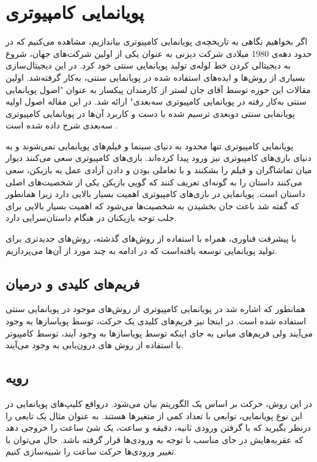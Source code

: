 \section{پویانمایی کامپیوتری}

اگر بخواهیم نگاهی به تاریخچه‌ی پویانمایی کامپیوتری بیاندازیم، مشاهده می‌کنیم که 
در حدود دهه‌ی 1980 میلادی شرکت دیزنی به عنوان یکی از اولین شرکت‌های جهان، شروع به 
دیجیتالی کردن خط لوله‌ی تولید پویانمایی سنتی خود کرد.
در این دیجیتال‌سازی بسیاری از روش‌ها و ایده‌‌های استفاده شده در پویانمایی سنتی،
به‌کار گرفته‌شد.
اولین مقالات این حوزه توسط آقای جان لستر از کارمندان پیکسار به عنوان 
"اصول پویانمایی سنتی به‌کار رفته در پویانمایی کامپیوتری سه‌بعدی"
ارائه شد.
در این مقاله اصول اولیه پویانمایی سنتی دوبعدی ترسیم شده با دست
و کاربرد آن‌ها در پویانمایی کامپیوتری سه‌بعدی شرح داده شده است \cite{Lasseter1987animation}.
 
پویانمایی کامپیوتری تنها محدود به دنیای سینما و فیلم‌های پویانمایی نمی‌شوند و به دنیای
بازی‌های کامپیوتری نیز ورود پیدا کرده‌اند. بازی‌های کامپیوتری سعی می‌کنند دیوار میان تماشاگران و فیلم را بشکنند و 
با تعاملی بودن و دادن آزادی عمل به بازیکن، سعی می‌کنند داستان را به گونه‌ای تعریف کنند که گویی بازیکن یکی از شخصیت‌های اصلی داستان است.
پویانمایی در بازی‌های کامپیوتری اهمیت بسیار بالایی دارد زیرا همانطور که گفته شد باعث 
جان بخشیدن به شخصیت‌ها می‌شود که اهمیت بسیار بالایی برای جلب توجه بازیکنان در هنگام داستان‌سرایی دارد.

با پیشرفت فناوری، همراه با استفاده از روش‌های گذشته، روش‌های جدیدتری برای تولید پویانمایی توسعه یافته‌است که 
در ادامه به چند مورد از آن‌‌ها می‌پردازیم.

\subsection{فریم‌های کلیدی و درمیان}

همانطور که اشاره شد در پویانمایی کامپیوتری از روش‌های موجود در 
پویانمایی سنتی استفاده شده است. در اینجا نیز فریم‌های کلیدی 
یک حرکت، توسط پویاسازها به وجود می‌‌آیند ولی فریم‌های میانی به جای اینکه توسط پویاسازها به وجود آیند،
توسط کامپیوتر با استفاده از روش های درون‌یابی به وجود می‌آیند.

\subsection{رویه}

در این روش، حرکت بر اساس یک الگوریتم بیان می‌شود.
درواقع کلیپ‌های پویانمایی در این نوع پویانمایی، توابعی با تعداد کمی از متغیر‌ها هستند.
به عنوان مثال یک تابعی را درنظر بگیرید که با گرفتن ورودی ثانیه، دقیقه و ساعت، 
یک شئ ساعت را خروجی دهد که عقربه‌هایش در جای مناسب با توجه به ورودی‌ها قرار گرفته باشد.
حال می‌توان با تغییر ورودی‌ها حرکت ساعت را شبیه‌سازی کنیم.

